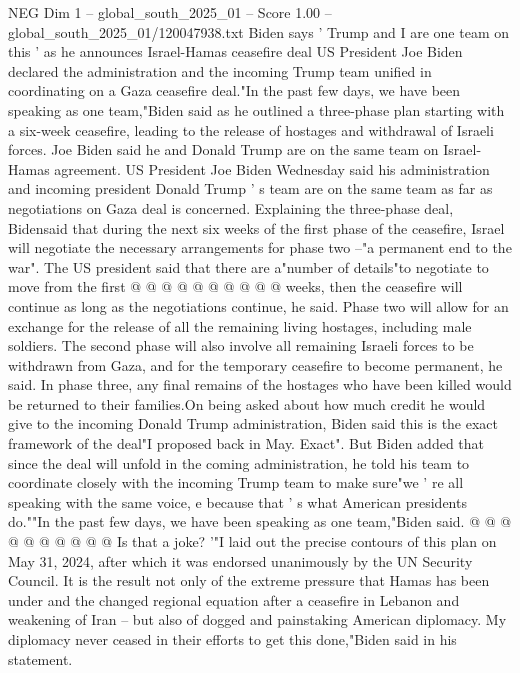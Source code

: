 \begin{textsample}{NEG Dim 1 – global\_south\_2025\_01 – Score 1.00 – global\_south\_2025\_01/120047938.txt}  \label{ex:f1_neg_155}
Biden says ' Trump and I are one team on this ' as he announces Israel-Hamas ceasefire deal US President Joe Biden declared the administration and the incoming Trump team unified in coordinating on a Gaza ceasefire deal."In the past few days, we have been speaking as one team,"Biden said as he outlined a three-phase plan starting with a six-week ceasefire, leading to the release of hostages and withdrawal of Israeli forces.
Joe Biden said he and Donald Trump are on the same team on Israel-Hamas agreement.
US President Joe Biden Wednesday said his administration and incoming president Donald Trump ' s team are on the same team as far as negotiations on Gaza deal is concerned.
Explaining the three-phase deal, Bidensaid that during the next six weeks of the first phase of the ceasefire, Israel will negotiate the necessary arrangements for phase two --"a permanent end to the war".
The US president said that there are a"number of details"to negotiate to move from the first @ @ @ @ @ @ @ @ @ @ weeks, then the ceasefire will continue as long as the negotiations continue, he said.
Phase two will allow for an exchange for the release of all the remaining living hostages, including male soldiers.
The second phase will also involve all remaining Israeli forces to be withdrawn from Gaza, and for the temporary ceasefire to become permanent, he said.
In phase three, any final remains of the hostages who have been killed would be returned to their families.On being asked about how much credit he would give to the incoming Donald Trump administration, Biden said this is the exact framework of the deal"I proposed back in May.
Exact".
But Biden added that since the deal will unfold in the coming administration, he told his team to coordinate closely with the incoming Trump team to make sure"we ' re all speaking with the same voice, e because that ' s what American presidents do.""In the past few days, we have been speaking as one team,"Biden said. @ @ @ @ @ @ @ @ @ @ Is that a joke? '"I laid out the precise contours of this plan on May 31, 2024, after which it was endorsed unanimously by the UN Security Council.
It is the result not only of the extreme pressure that Hamas has been under and the changed regional equation after a ceasefire in Lebanon and weakening of Iran -- but also of dogged and painstaking American diplomacy.
My diplomacy never ceased in their efforts to get this done,"Biden said in his statement.

\end{textsample}
